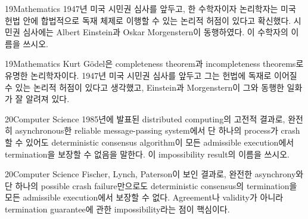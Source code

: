 \documentclass[12pt,aspectratio=169]{beamer}
\begin{document}
\begin{problemframe}{19}{Mathematics}
1947년 미국 시민권 심사를 앞두고, 한 수학자이자 논리학자는 미국 헌법 안에 합법적으로 독재 체제로 이행할 수 있는 논리적 허점이 있다고 확신했다. 시민권 심사에는 Albert Einstein과 Oskar Morgenstern이 동행하였다. 이 수학자의 이름을 쓰시오.
\end{problemframe}

\begin{solutionframe}{19}{Mathematics}
Kurt Gödel은 completeness theorem과 incompleteness theorems로 유명한 논리학자이다. 1947년 미국 시민권 심사를 앞두고 그는 헌법에 독재로 이어질 수 있는 논리적 허점이 있다고 생각했고, Einstein과 Morgenstern이 그와 동행한 일화가 잘 알려져 있다.
\end{solutionframe}

\begin{problemframe}{20}{Computer Science}
1985년에 발표된 distributed computing의 고전적 결과로, 완전히 asynchronous한 reliable message-passing system에서 단 하나의 process가 crash할 수 있어도 deterministic consensus algorithm이 모든 admissible execution에서 termination을 보장할 수 없음을 말한다. 이 impossibility result의 이름을 쓰시오.
\end{problemframe}

\begin{solutionframe}{20}{Computer Science}
Fischer, Lynch, Paterson이 보인 결과로, 완전한 asynchrony와 단 하나의 possible crash failure만으로도 deterministic consensus의 termination을 모든 admissible execution에서 보장할 수 없다. Agreement나 validity가 아니라 termination guarantee에 관한 impossibility라는 점이 핵심이다.
\end{solutionframe}
\end{document}
